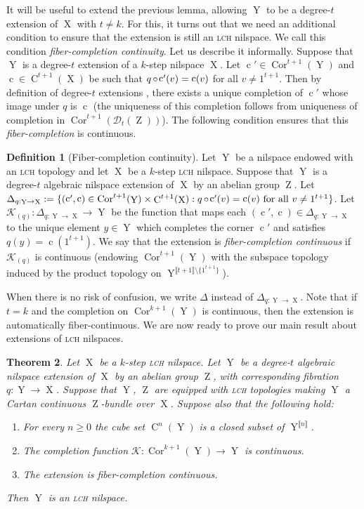 \documentclass[a4paper,12pt,reqno]{amsart}
\newtheorem{theorem}{Theorem}[section]
\theoremstyle{definition}
\newtheorem{defn}[theorem]{Definition}
\def\to{\rightarrow}
\newcommand*{\db}[1]{\llbracket #1\rrbracket}
\newcommand{\mc}{\mathcal}
\DeclareMathOperator{\ab}{Z}
\DeclareMathOperator{\q}{c}
\DeclareMathOperator{\ns}{X}
\DeclareMathOperator{\nss}{Y}
\DeclareMathOperator{\co}{\circ\hspace{-0.02 cm}}
\DeclareMathOperator{\cu}{C}
\DeclareMathOperator{\cor}{Cor}
\begin{document}
\noindent It will be useful to extend the previous lemma, allowing $\nss$ to be a degree-$t$ extension of $\ns$ with $t \neq k$. For this, it turns out that we need an additional condition to ensure that the extension is still an \textsc{lch} nilspace. We call this condition \emph{fiber-completion continuity}. Let us describe it informally. Suppose that $\nss$ is a degree-$t$ extension of a $k$-step nilspace $\ns$. Let $\q'\in\cor^{t+1}(\nss)$ and $\q\in \cu^{t+1}(\ns)$ be such that $q\co\q'(v)=\q(v)$ for all $v\not=1^{t+1}$. Then by definition of degree-$t$ extensions \cite[Definition 3.3.13]{Cand:Notes1}, there exists a unique completion of $\q'$ whose image under $q$ is $\q$ (the uniqueness of this completion follows from uniqueness of  completion in $\cor^{t+1}(\mc{D}_t(\ab))$). The following condition ensures that this \emph{fiber-completion} is continuous.

\begin{defn}[Fiber-completion continuity]\label{def:fib-comp-cont}
Let $\nss$ be a nilspace endowed with an \textsc{lch} topology and let $\ns$ be a $k$-step \textsc{lch} nilspace. Suppose that $\nss$ is a degree-$t$ algebraic nilspace extension of $\ns$ by an abelian group $\ab$. Let $\Delta_{q:\nss\to\ns}:= \{(\q',\q)\in \cor^{t+1}(\nss)\times \cu^{t+1}(\ns):q\co \q'(v)=\q(v)\text{ for all } v\not=1^{t+1}\}$. Let $\mc{K}_{(q)}:\Delta_{q:\nss\to\ns}\to \nss$ be the function that maps each $(\q',\q)\in \Delta_{q:\nss\to\ns}$ to the unique element $y\in\nss$ which completes the corner $\q'$ and satisfies $q(y)=\q(1^{t+1})$. We say that the extension is \emph{fiber-completion continuous} if $\mc{K}_{(q)}$ is continuous (endowing $\cor^{t+1}(\nss)$ with the subspace topology induced by the product topology on $\nss^{\db{t+1}\setminus\{1^{t+1}\}}$).
\end{defn}
\noindent When there is no risk of confusion, we write $\Delta$ instead of $\Delta_{q:\nss\to\ns}$. Note that if $t=k$ and the completion on $\cor^{k+1}(\nss)$ is continuous, then the extension is  automatically fiber-continuous. We are now ready to prove our main result about extensions of \textsc{lch} nilspaces.

\begin{theorem}\label{thm:ext-lch-nil}
Let $\ns$ be a $k$-step \textsc{lch} nilspace. Let $\nss$ be a degree-$t$ algebraic nilspace extension of $\ns$ by an abelian group $\ab$, with corresponding fibration $q:\nss\to\ns$. Suppose that $\nss$, $\ab$ are equipped with \textsc{lch} topologies making $\nss$ a Cartan continuous $\ab$-bundle over $\ns$. Suppose also that the following hold:
\begin{enumerate}
    \item For every $n\geq 0$ the cube set $\cu^n(\nss)$ is a closed subset of $\nss^{\db{n}}$.
    \item The completion function $\mc{K}:\cor^{k+1}(\nss)\to \nss$ is continuous.
    \item The extension is fiber-completion continuous.
\end{enumerate}
Then $\nss$ is an \textsc{lch} nilspace.
\end{theorem}
\end{document}
